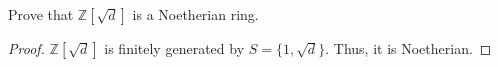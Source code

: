 \begin{problem}
    Prove that $\mathbb{Z}[\sqrt{d}]$ is a Noetherian ring.
    \begin{sol}
        \begin{proof}
            $\mathbb{Z}[\sqrt{d}]$ is finitely generated by $S = \{1, \sqrt{d}\}$.
            Thus, it is Noetherian.
        \end{proof}
    \end{sol}
\end{problem}